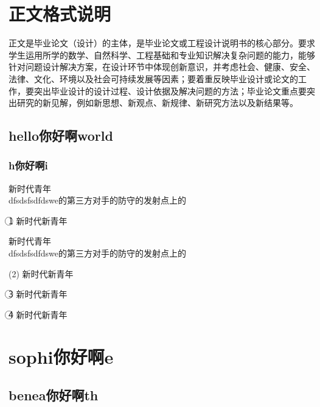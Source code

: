 \documentclass{ctexart}%
\newenvironment{paar}[0]
	{\par \songti \zihao{-4}  \justifying \linespread{1.25} \setlength{\parindent}{24pt} }{\par}
\newenvironment{seq1}[1]
	{\par \songti \zihao{-4}  \justifying \linespread{1.25} \setlength{\parindent}{24pt} ({#1})  }{\par}
\newenvironment{seq2}[1]
	{\par \songti \zihao{-4}  \justifying \linespread{1.25} \setlength{\parindent}{24pt} \textcircled{#1} }{\par}
\begin{document}
	\section{正文格式说明}
	正文是毕业论文（设计）的主体，是毕业论文或工程设计说明书的核心部分。要求学生运用所学的数学、自然科学、工程基础和专业知识解决复杂问题的能力，能够针对问题设计解决方案，在设计环节中体现创新意识，并考虑社会、健康、安全、法律、文化、环境以及社会可持续发展等因素；要着重反映毕业设计或论文的工作，要突出毕业设计的设计过程、设计依据及解决问题的方法；毕业论文重点要突出研究的新见解，例如新思想、新观点、新规律、新研究方法以及新结果等。\par
	\subsection{hello你好啊world}
	\subsubsection{h你好啊i}

	\begin{paar}
		新时代青年\\dfsdsfsdfdswe的第三方对手的防守的发射点上的\\
	\end{paar}
	\begin{seq2}{1}
	新时代新青年
	\end{seq2}
	\begin{paar}
		新时代青年\\dfsdsfsdfdswe的第三方对手的防守的发射点上的\\
	\end{paar}	
	\begin{seq1}{2}
	新时代新青年
	\end{seq1}
	\begin{seq2}{3}
	新时代新青年
	\end{seq2}
	\begin{seq2}{4}
	新时代新青年
	\end{seq2}
	\section{sophi你好啊e}
	\subsection{benea你好啊th}
\end{document}
